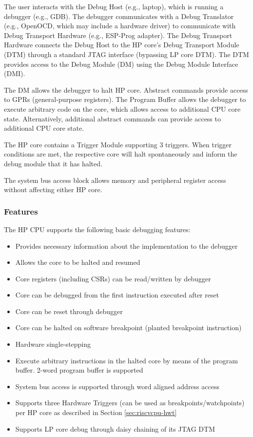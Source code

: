 \documentclass[main\_\_EN.tex]{subfiles}
\begin{document}
The user interacts with the Debug Host (e.g., laptop), which is running a debugger (e.g., GDB). The debugger communicates with a Debug Translator (e.g., OpenOCD, which may include a hardware driver) to communicate with Debug Transport Hardware (e.g., ESP-Prog adapter). The Debug Transport Hardware connects the Debug Host to the HP core's Debug Transport Module (DTM) through a standard JTAG interface (bypassing LP core DTM). The DTM provides access to the Debug Module (DM) using the Debug Module Interface (DMI).

The DM allows the debugger to halt HP core. Abstract commands provide access to GPRs (general-purpose registers). The Program Buffer allows the debugger to execute arbitrary code on the core, which allows access to additional CPU core state. Alternatively, additional abstract commands can provide access to additional CPU core state.

The HP core contains a Trigger Module supporting 3 triggers. When trigger conditions are met, the respective core will halt spontaneously and inform the debug module that it has halted.

The system bus access block allows memory and peripheral register access without affecting either HP core.


\subsubsection{Features}
\label{sec:riscvcpu-dbg-features}

The HP CPU supports the following basic debugging features:

\begin{itemize}
    \item Provides necessary information about the implementation to the debugger
    \item Allows the core to be halted and resumed
    \item Core registers (including CSRs) can be read/written by debugger
    \item Core can be debugged from the first instruction executed after reset
    \item Core can be reset through debugger
    \item Core can be halted on software breakpoint (planted breakpoint instruction)
    \item Hardware single-stepping
    \item Execute arbitrary instructions in the halted core by means of the program buffer. 2-word program buffer is supported
    \item System bus access is supported through word aligned address access
    \item Supports three Hardware Triggers (can be used as breakpoints/watchpoints) per HP core as described in Section \ref{sec:riscvcpu-hwt}
    \item Supports LP core debug through daisy chaining of its JTAG DTM
\end{itemize}
\end{document}
